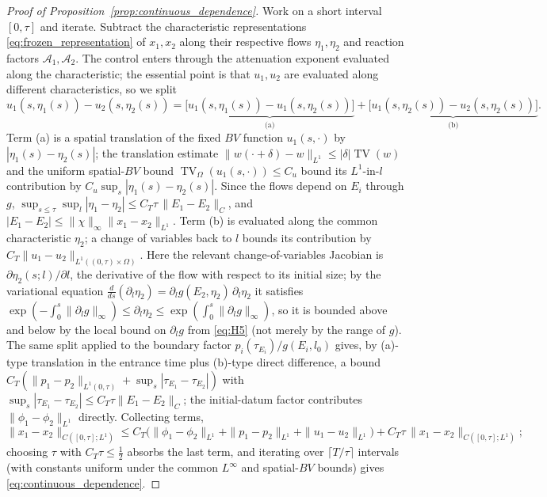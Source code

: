\documentclass[pdflatex,sn-mathphys-num]{sn-jnl}
\newcommand{\Om}{\Omega}
\DeclareMathOperator{\TV}{TV}
\theoremstyle{plain}
\theoremstyle{definition}
\theoremstyle{remark}
\begin{document}
\begin{proof}[Proof of Proposition~\ref{prop:continuous_dependence}]
Work on a short interval $[0,\tau]$ and iterate. Subtract the characteristic
representations \eqref{eq:frozen_representation} of $x_1,x_2$ along their
respective flows $\eta_1,\eta_2$ and reaction factors $\mathcal A_1,\mathcal A_2$.
The control enters through the attenuation exponent evaluated along the
characteristic; the essential point is that $u_1,u_2$ are evaluated along different characteristics, so we split
\[
u_1(s,\eta_1(s))-u_2(s,\eta_2(s))
=\underbrace{\big[u_1(s,\eta_1(s))-u_1(s,\eta_2(s))\big]}_{\text{(a)}}
+\underbrace{\big[u_1(s,\eta_2(s))-u_2(s,\eta_2(s))\big]}_{\text{(b)}}.
\]
Term (a) is a spatial translation of the fixed $BV$ function $u_1(s,\cdot)$ by
$|\eta_1(s)-\eta_2(s)|$; the translation estimate
$\|w(\cdot+\delta)-w\|_{L^1}\le|\delta|\TV(w)$ and the uniform spatial-$BV$ bound
$\TV_\Om(u_1(s,\cdot))\le C_u$ bound its $L^1$-in-$l$ contribution by
$C_u\sup_s|\eta_1(s)-\eta_2(s)|$. Since the flows depend on $E_i$ through $g$,
$\sup_{s\le\tau}\sup_l|\eta_1-\eta_2|\le C_T\tau\,\|E_1-E_2\|_{C}$, and
$|E_1-E_2|\le\|\chi\|_\infty\|x_1-x_2\|_{L^1}$. Term (b) is evaluated along the
common characteristic $\eta_2$; a change of variables back to $l$ bounds its
contribution by $C_T\|u_1-u_2\|_{L^1((0,\tau)\times\Om)}$. Here the relevant
change-of-variables Jacobian is $\partial\eta_2(s;l)/\partial l$, the derivative of
the flow with respect to its initial size; by the variational equation
$\tfrac{d}{ds}(\partial_l\eta_2)=\partial_lg(E_2,\eta_2)\,\partial_l\eta_2$ it
satisfies
$\exp(-\!\int_0^s\|\partial_lg\|_\infty)\le\partial_l\eta_2\le
\exp(\int_0^s\|\partial_lg\|_\infty)$, so it is bounded above and below by the
local bound on $\partial_lg$ from \eqref{eq:H5} (not merely by the range of $g$). The same split applied
to the boundary factor $p_i(\tau_{E_i})/g(E_i,l_0)$ gives, by (a)-type translation
in the entrance time plus (b)-type direct difference, a bound
$C_T(\|p_1-p_2\|_{L^1(0,\tau)}+\sup_s|\tau_{E_1}-\tau_{E_2}|)$ with
$\sup_s|\tau_{E_1}-\tau_{E_2}|\le C_T\tau\|E_1-E_2\|_C$; the initial-datum factor
contributes $\|\phi_1-\phi_2\|_{L^1}$ directly. Collecting terms,
\[
\|x_1-x_2\|_{C([0,\tau];L^1)}
\le C_T\big(\|\phi_1-\phi_2\|_{L^1}+\|p_1-p_2\|_{L^1}+\|u_1-u_2\|_{L^1}\big)
+C_T\tau\,\|x_1-x_2\|_{C([0,\tau];L^1)};
\]
choosing $\tau$ with $C_T\tau\le\tfrac12$ absorbs the last term, and iterating over
$\lceil T/\tau\rceil$ intervals (with constants uniform under the common
$L^\infty$ and spatial-$BV$ bounds) gives \eqref{eq:continuous_dependence}.
\end{proof}
\end{document}
